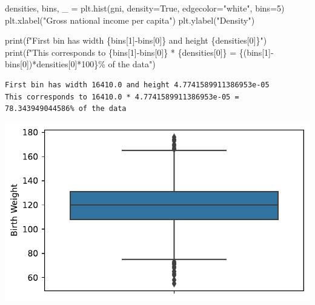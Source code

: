 \documentclass[
  letterpaper,
  DIV=11,
  numbers=noendperiod]{scrreprt}
\newenvironment{Shaded}{\begin{snugshade}}{\end{snugshade}}
\newcommand{\BuiltInTok}[1]{\textcolor[rgb]{0.00,0.23,0.31}{#1}}
\newcommand{\DecValTok}[1]{\textcolor[rgb]{0.68,0.00,0.00}{#1}}
\newcommand{\NormalTok}[1]{\textcolor[rgb]{0.00,0.23,0.31}{#1}}
\newcommand{\OperatorTok}[1]{\textcolor[rgb]{0.37,0.37,0.37}{#1}}
\newcommand{\SpecialCharTok}[1]{\textcolor[rgb]{0.37,0.37,0.37}{#1}}
\newcommand{\SpecialStringTok}[1]{\textcolor[rgb]{0.13,0.47,0.30}{#1}}
\newcommand{\StringTok}[1]{\textcolor[rgb]{0.13,0.47,0.30}{#1}}
\newcommand{\VariableTok}[1]{\textcolor[rgb]{0.07,0.07,0.07}{#1}}
\begin{document}
\begin{Shaded}
\begin{Highlighting}[]
\NormalTok{densities, bins, \_ }\OperatorTok{=}\NormalTok{ plt.hist(gni, density}\OperatorTok{=}\VariableTok{True}\NormalTok{, edgecolor}\OperatorTok{=}\StringTok{"white"}\NormalTok{, bins}\OperatorTok{=}\DecValTok{5}\NormalTok{)}
\NormalTok{plt.xlabel(}\StringTok{"Gross national income per capita"}\NormalTok{)}
\NormalTok{plt.ylabel(}\StringTok{"Density"}\NormalTok{)}

\BuiltInTok{print}\NormalTok{(}\SpecialStringTok{f"First bin has width }\SpecialCharTok{\{}\NormalTok{bins[}\DecValTok{1}\NormalTok{]}\OperatorTok{{-}}\NormalTok{bins[}\DecValTok{0}\NormalTok{]}\SpecialCharTok{\}}\SpecialStringTok{ and height }\SpecialCharTok{\{}\NormalTok{densities[}\DecValTok{0}\NormalTok{]}\SpecialCharTok{\}}\SpecialStringTok{"}\NormalTok{)}
\BuiltInTok{print}\NormalTok{(}\SpecialStringTok{f"This corresponds to }\SpecialCharTok{\{}\NormalTok{bins[}\DecValTok{1}\NormalTok{]}\OperatorTok{{-}}\NormalTok{bins[}\DecValTok{0}\NormalTok{]}\SpecialCharTok{\}}\SpecialStringTok{ * }\SpecialCharTok{\{}\NormalTok{densities[}\DecValTok{0}\NormalTok{]}\SpecialCharTok{\}}\SpecialStringTok{ = }\SpecialCharTok{\{}\NormalTok{(bins[}\DecValTok{1}\NormalTok{]}\OperatorTok{{-}}\NormalTok{bins[}\DecValTok{0}\NormalTok{])}\OperatorTok{*}\NormalTok{densities[}\DecValTok{0}\NormalTok{]}\OperatorTok{*}\DecValTok{100}\SpecialCharTok{\}}\SpecialStringTok{\% of the data"}\NormalTok{)}
\end{Highlighting}
\end{Shaded}

\begin{verbatim}
First bin has width 16410.0 and height 4.7741589911386953e-05
This corresponds to 16410.0 * 4.7741589911386953e-05 = 78.343949044586% of the data
\end{verbatim}

\includegraphics{visualization_1/visualization_1_files/figure-pdf/cell-18-output-2.pdf}
\end{document}
